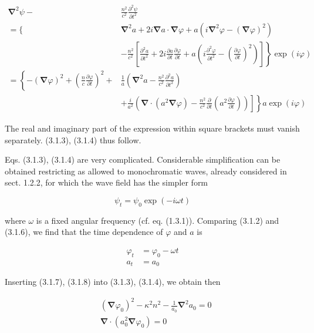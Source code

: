 \documentclass{article}
\begin{document}
\begin{align*}
\boldsymbol{\nabla}^{2} \psi- & \frac{n^{2}}{c^{2}} \frac{\partial^{2} \psi}{\partial t^{2}}  \tag{3.1.5}\\
=\{ & \boldsymbol{\nabla}^{2} a+2 i \boldsymbol{\nabla} a \cdot \boldsymbol{\nabla} \varphi+a\left(i \boldsymbol{\nabla}^{2} \varphi-(\boldsymbol{\nabla} \varphi)^{2}\right) \\
& \left.-\frac{n^{2}}{c^{2}}\left[\frac{\partial^{2} a}{\partial t^{2}}+2 i \frac{\partial a}{\partial t} \frac{\partial \varphi}{\partial t}+a\left(i \frac{\partial^{2} \varphi}{\partial t^{2}}-\left(\frac{\partial \varphi}{\partial t}\right)^{2}\right)\right]\right\} \exp (i \varphi) \\
=\left\{-(\boldsymbol{\nabla} \varphi)^{2}+\left(\frac{n}{c} \frac{\partial \varphi}{\partial t}\right)^{2}+\right. & \frac{1}{a}\left(\boldsymbol{\nabla}^{2} a-\frac{n^{2}}{c^{2}} \frac{\partial^{2} a}{\partial t^{2}}\right) \\
& \left.\left.+\frac{i}{a^{2}}\left(\boldsymbol{\nabla} \cdot\left(a^{2} \boldsymbol{\nabla} \varphi\right)-\frac{n^{2}}{c^{2}} \frac{\partial}{\partial t}\left(a^{2} \frac{\partial \varphi}{\partial t}\right)\right)\right]\right\} a \exp (i \varphi)
\end{align*}
 

The real and imaginary part of the expression within square brackets must vanish separately. (3.1.3), (3.1.4) thus follow.

Eqs. (3.1.3), (3.1.4) are very complicated. Considerable simplification can be obtained restricting as allowed to monochromatic waves, already considered in sect. 1.2.2, for which the wave field has the simpler form
 
\begin{equation*}
\psi_{t}=\psi_{0} \exp (-i \omega t) \tag{3.1.6}
\end{equation*}
 
where $\omega$ is a fixed angular frequency (cf. eq. (1.3.1)). Comparing (3.1.2) and (3.1.6), we find that the time dependence of $\varphi$ and $a$ is
 
\begin{align*}
\varphi_{t} & =\varphi_{0}-\omega t  \tag{3.1.7}\\
a_{t} & =a_{0} \tag{3.1.8}
\end{align*}
 

Inserting (3.1.7), (3.1.8) into (3.1.3), (3.1.4), we obtain then
 
\begin{align*}
& \left(\boldsymbol{\nabla} \varphi_{0}\right)^{2}-\kappa^{2} n^{2}-\frac{1}{a_{0}} \boldsymbol{\nabla}^{2} a_{0}=0  \tag{3.1.9}\\
& \boldsymbol{\nabla} \cdot\left(a_{0}^{2} \boldsymbol{\nabla} \varphi_{0}\right)=0 \tag{3.1.10}
\end{align*}
 
\end{document}
